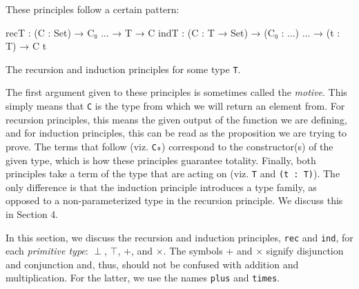 \documentclass[12pt]{article}
\begin{document}
These principles follow a certain pattern:
\begin{center}
\begin{minipage}{0.9\textwidth}
\begin{code}
recT : (C : Set) → C₀ ... → T → C
indT : (C : T → Set) → (C₀ : ...) ... → (t : T) → C t
\end{code}
\end{minipage}

\begin{minipage}{0.7\textwidth}
\begin{small}
The recursion and induction principles for some type {\tt T}.
\end{small}
\end{minipage}
\end{center}
The first argument given to these principles is sometimes called the {\em motive}.
This simply means that {\tt C} is the type from which we will return an element
from. For recursion principles, this means the given output of the function we
are defining, and for induction principles, this can be read as the proposition
we are trying to prove. The terms that follow (viz. {\tt C₀}) correspond to the
constructor(s) of the given type, which is how these principles guarantee
totality. Finally, both principles take a term of the type that are acting on
(viz. {\tt T} and {\tt (t : T)}). The only difference is that the induction
principle introduces a type family, as opposed to a non-parameterized type in the
recursion principle. We discuss this in Section 4.

In this section, we discuss the recursion and induction principles, {\tt rec}
and {\tt ind}, for each {\em primitive type}: \(\perp\), \(\top\), +,
and \(\times\). The symbols + and \(\times\) signify disjunction and conjunction
and, thus, should not be confused with addition and multiplication. For the
latter, we use the names {\tt plus} and {\tt times}.
\end{document}
